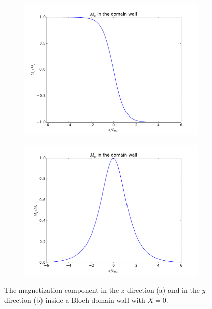 \documentclass[1p]{elsarticle}		%
\numberwithin{equation}{section}
\begin{document}
\begin{figure}[h!]
\centering
\begin{subfigure}{.5\textwidth}
  \centering
  \includegraphics[width=1.0\linewidth]{Figures/BlochWallMz}
  \caption{}
\end{subfigure}%
\begin{subfigure}{.5\textwidth}
  \centering
  \includegraphics[width=1.0\linewidth]{Figures/BlochWallMy}
  \caption{}
\end{subfigure}
\caption{The magnetization component in the $z$-direction (a) and in the $y$-direction (b) inside a Bloch domain wall with $X = 0$.}
\label{fig:BlochWall}
\end{figure}
\end{document}
